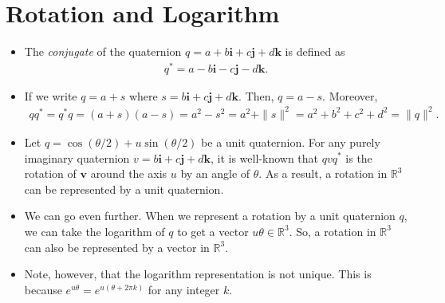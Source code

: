 \documentclass[10pt]{article}
\newcommand{\ve}[1]{\mathbf{#1}}
\newcommand{\Real}{\mathbb{R}}
\begin{document}
\section{Rotation and Logarithm}

\begin{itemize}
    \item The \emph{conjugate} of the quaternion $q = a + b\ve{i} + c\ve{j} + d\ve{k}$ is defined as
    \begin{align*}
        q^* = a - b\ve{i} - c\ve{j} - d\ve{k}.
    \end{align*}
    
    \item If we write $q = a + s$ where $s = b\ve{i} + c\ve{j} + d\ve{k}$. Then, $q = a - s$. Moreover,
    \begin{align*}
        qq^* = q^*q = (a + s)(a - s) = a^2 - s^2 = a^2 + \| s \|^2 = a^2 + b^2 + c^2 + d^2 = \|q\|^2.
    \end{align*}    

    \item Let $q = \cos (\theta/2) + u \sin (\theta/2)$ be a unit quaternion. For any purely imaginary quaternion $v = b \ve{i} + c \ve{j} + d \ve{k}$, it is well-known that $qvq^*$ is the rotation of $\ve{v}$ around the axis $u$ by an angle of $\theta$. As a result, a rotation in $\Real^3$ can be represented by a unit quaternion.
    
    \item We can go even further. When we represent a rotation by a unit quaternion $q$, we can take the logarithm of $q$ to get a vector $u \theta \in \Real^3$. So, a rotation in $\Real^3$ can also be represented by a vector in $\Real^3$.
    
    \item Note, however, that the logarithm representation is not unique. This is because $e^{u\theta} = e^{u(\theta + 2\pi k)}$ for any integer $k$.
\end{itemize}



  
\end{document}
